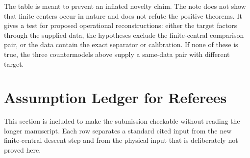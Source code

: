 \documentclass[12pt]{article}
\theoremstyle{definition}
\theoremstyle{remark}
\begin{document}
The table is meant to prevent an inflated novelty claim.  The note does not
show that finite centers occur in nature and does not refute the positive
theorems.  It gives a test for proposed operational reconstructions: either
the target factors through the supplied data, the hypotheses exclude the
finite-central comparison pair, or the data contain the exact separator or
calibration.  If none of these is true, the three countermodels above supply a
same-data pair with different target.

\section{Assumption Ledger for Referees}

This section is included to make the submission checkable without reading the
longer manuscript.  Each row separates a standard cited input from the new
finite-central descent step and from the physical input that is deliberately
not proved here.
\end{document}
